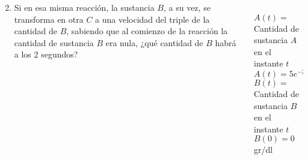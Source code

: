 \documentclass[aspectratio=149,10pt,xcolor=dvipsnames,t]{beamer}
\begin{document}
\begin{frame}
\begin{columns}
\begin{column}[T]{0.65\textwidth}
\begin{enumerate}
\setcounter{enumi}{1}
\item Si en esa misma reacción, la sustancia $B$, a su vez, se transforma en otra $C$ a una velocidad del triple de la
cantidad de $B$, sabiendo que al comienzo de la reacción la cantidad de sustancia $B$ era nula, ¿qué cantidad de $B$
habrá a los 2 segundos?
\end{enumerate}
\end{column}
\begin{column}[T]{0.35\textwidth}
\\
$A(t)=$ Cantidad de sustancia $A$ en el instante $t$\\
$A(t)=5e^{-2t}$\\
$B(t)=$ Cantidad de sustancia $B$ en el instante $t$\\
$B(0)=0$ gr/dl
\end{column}
\end{columns}
\end{frame}
\end{document}
